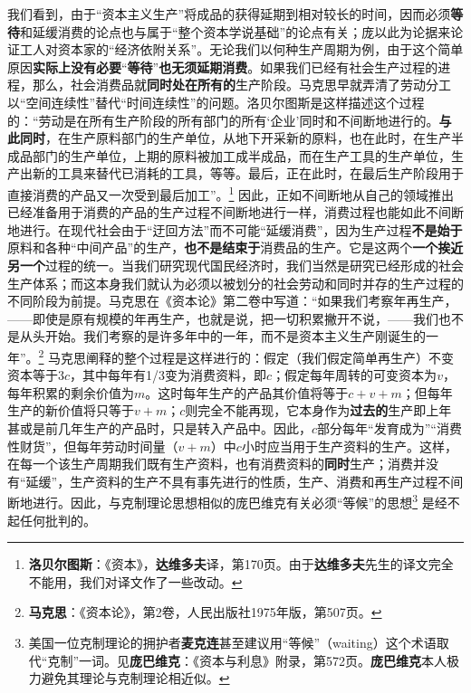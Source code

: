 \documentclass[fontset=fandol, a4paper, 12pt, openright]{ctexbook}
\begin{document}
我们看到，由于“资本主义生产”将成品的获得延期到相对较长的时间，因而必须\textbf{等待}和延缓消费的论点也与属于“整个资本学说基础”的论点有关；庞以此为论据来论证工人对资本家的“经济依附关系”。无论我们以何种生产周期为例，由于这个简单原因\textbf{实际上没有必要}“\textbf{等待}”\textbf{也无须延期消费}。如果我们已经有社会生产过程的进程，那么，社会消费品就\textbf{同时处在所有的}生产阶段。马克思早就弄清了劳动分工以“空间连续性”替代“时间连续性”的问题。洛贝尔图斯是这样描述这个过程的：“劳动是在所有生产阶段的所有部门的所有‘企业’同时和不间断地进行的。\textbf{与此同时}，在生产原料部门的生产单位，从地下开采新的原料，也在此时，在生产半成品部门的生产单位，上期的原料被加工成半成品，而在生产工具的生产单位，生产出新的工具来替代已消耗的工具，等等。最后，正在此时，在最后生产阶段用于直接消费的产品又一次受到最后加工”。\footnote{\textbf{洛贝尔图斯}：《资本》，\textbf{达维多夫}译，第170页。由于\textbf{达维多夫}先生的译文完全不能用，我们对译文作了一些改动。} 因此，正如不间断地从自己的领域推出已经准备用于消费的产品的生产过程不间断地进行一样，消费过程也能如此不间断地进行。在现代社会由于“迂回方法”而不可能“延缓消费”，因为生产过程\textbf{不是始于}原料和各种“中间产品”的生产，\textbf{也不是结束于}消费品的生产。它是这两个\textbf{一个挨近另一个}过程的统一。当我们研究现代国民经济时，我们当然是研究已经形成的社会生产体系；而这本身我们就认为必须以被划分的社会劳动和同时并存的生产过程的不同阶段为前提。马克思在《资本论》第二卷中写道：“如果我们考察年再生产，——即使是原有规模的年再生产，也就是说，把一切积累撇开不说，——我们也不是从头开始。我们考察的是许多年中的一年，而不是资本主义生产刚诞生的一年”。\footnote{\textbf{马克思}：《资本论》，第2卷，人民出版社1975年版，第507页。} 马克思阐释的整个过程是这样进行的：假定（我们假定简单再生产）不变资本等于$3c$，其中每年有1/3变为消费资料，即$c$；假定每年周转的可变资本为$v$，每年积累的剩余价值为$m$。这时每年生产的产品其价值将等于$c+v+m$；但每年生产的新价值将只等于$v+m$；$c$则完全不能再现，它本身作为\textbf{过去的}生产即上年甚或是前几年生产的产品时，只是转入产品中。因此，$c$部分每年“发育成为”“消费性财货”，但每年劳动时间量（$v+m$）中$c$小时应当用于生产资料的生产。这样，在每一个该生产周期我们既有生产资料，也有消费资料的\textbf{同时}生产；消费并没有“延缓”，生产资料的生产不具有事先进行的性质，生产、消费和再生产过程不间断地进行。因此，与克制理论思想相似的庞巴维克有关必须“等候”的思想\footnote{美国一位克制理论的拥护者\textbf{麦克连}甚至建议用“等候”（waiting）这个术语取代“克制”一词。见\textbf{庞巴维克}：《资本与利息》附录，第572页。\textbf{庞巴维克}本人极力避免其理论与克制理论相近似。} 是经不起任何批判的。
\end{document}
